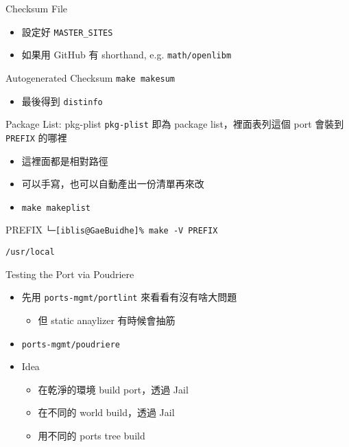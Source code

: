 \documentclass[aspectratio=169]{beamer}
\begin{document}
\begin{frame}[t,fragile]{Checksum File}
  \begin{itemize}
    \item 設定好 \verb`MASTER_SITES`
    \item 如果用 GitHub 有 shorthand, e.g. \verb`math/openlibm`
  \end{itemize}
  \begin{block}{Autogenerated Checksum}
    \verb`make makesum`
  \end{block}
  \begin{itemize}
    \item 最後得到 \verb`distinfo`
  \end{itemize}
\end{frame}

\begin{frame}[t,fragile]{Package List: pkg-plist}
  \verb`pkg-plist` 即為 package list，裡面表列這個 port 會裝到 \verb`PREFIX` 的哪裡
  \begin{itemize}
      \item 這裡面都是相對路徑
      \item 可以手寫，也可以自動產出一份清單再來改
      \item \verb`make makeplist`
  \end{itemize}

  \begin{block}{PREFIX}
    \verb`└─[iblis@GaeBuidhe]% make -V PREFIX`

    \verb`/usr/local`
  \end{block}

\end{frame}

\begin{frame}[t,fragile]{Testing the Port via Poudriere}
  \begin{itemize}
    \item 先用 \verb`ports-mgmt/portlint` 來看看有沒有啥大問題
      \begin{itemize}
        \item 但 static anaylizer 有時候會抽筋
      \end{itemize}
    \item \verb`ports-mgmt/poudriere`
    \item Idea
      \begin{itemize}
        \item 在乾淨的環境 build port，透過 Jail
        \item 在不同的 world build，透過 Jail
        \item 用不同的 ports tree build
      \end{itemize}
  \end{itemize}
\end{frame}
\end{document}
